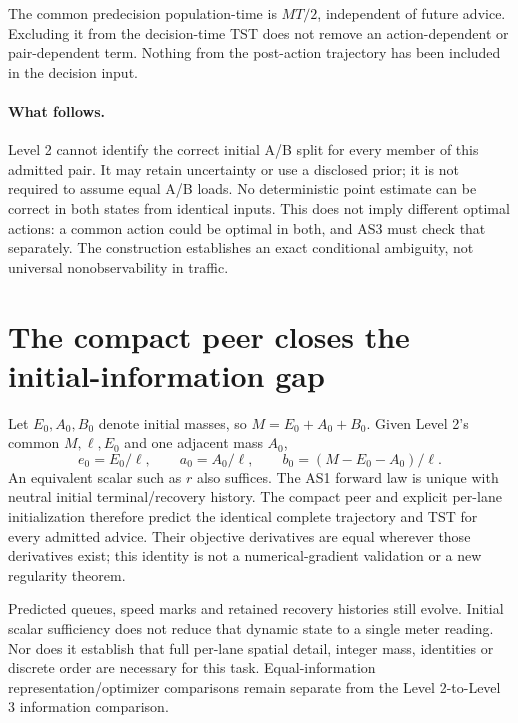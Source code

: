 \documentclass[11pt,a4paper]{article}
\begin{document}
The common predecision population-time is $MT/2$, independent of future
advice. Excluding it from the decision-time TST does not remove an
action-dependent or pair-dependent term. Nothing from the post-action
trajectory has been included in the decision input.

\paragraph{What follows.}
Level 2 cannot identify the correct initial A/B split for every member of
this admitted pair. It may retain uncertainty or use a disclosed prior;
it is not required to assume equal A/B loads. No deterministic point
estimate can be correct in both states from identical inputs. This does
not imply different optimal actions: a common action could be optimal in
both, and AS3 must check that separately. The construction establishes
an exact conditional ambiguity, not universal nonobservability in traffic.

\section{The compact peer closes the initial-information gap}
Let $E_0,A_0,B_0$ denote initial masses, so $M=E_0+A_0+B_0$.
Given Level 2's common $M,\ell,E_0$ and one adjacent mass $A_0$,
\begin{equation}
 e_0=E_0/\ell,\qquad a_0=A_0/\ell,\qquad
 b_0=(M-E_0-A_0)/\ell.
 \label{eq:compact}
\end{equation}
An equivalent scalar such as $r$ also suffices. The AS1 forward law is
unique with neutral initial terminal/recovery history. The compact peer
and explicit per-lane initialization therefore predict the identical
complete trajectory and TST for every admitted advice. Their objective
derivatives are equal wherever those derivatives exist; this identity is
not a numerical-gradient validation or a new regularity theorem.

Predicted queues, speed marks and retained recovery histories still evolve.
Initial scalar sufficiency does not reduce that dynamic state to a single
meter reading. Nor does it establish that full per-lane spatial detail,
integer mass, identities or discrete order are necessary for this task.
Equal-information representation/optimizer comparisons remain separate
from the Level 2-to-Level 3 information comparison.
\end{document}

